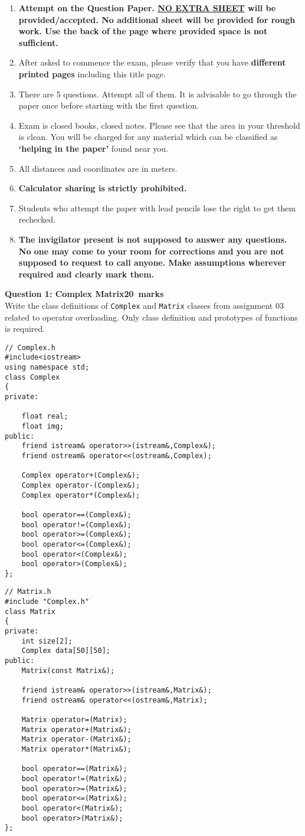 \documentclass[12pt,a4paper]{article}
\def\QOne{20}
\begin{document}
\begin{enumerate}
\item \textbf{Attempt on the Question Paper. \underline{NO EXTRA SHEET} will be provided/accepted. No
additional sheet will be provided for rough work. Use the back of the page where
provided space is not sufficient.}
\item After asked to commence the exam, please verify that you have \textbf{\pageref{LastPage} different
printed pages} including this title page.
\item There are 5 questions. Attempt all of them. It is advisable to go through the paper once
before starting with the first question.
\item Exam is closed books, closed notes. Please see that the area in your threshold is clean.
You will be charged for any material which can be classified as \textbf{`helping in the paper'}
found near you.
\item All distances and coordinates are in meters.
\item \textbf{Calculator sharing is strictly prohibited.}
\item Students who attempt the paper with lead pencils lose the right to get them rechecked.
\item \textbf{The invigilator present is not supposed to answer any questions. No one may come
to your room for corrections and you are not supposed to request to call anyone.
Make assumptions wherever required and clearly mark them.}
\end{enumerate}
\newpage
\noindent\textbf{Question 1: Complex Matrix\hfill \QOne~marks}\\
Write the class definitions of \verb|Complex| and \verb|Matrix| classes from assignment 03 related to operator overloading. Only class definition and prototypes of functions is required.
\begin{lstlisting}
// Complex.h
#include<iostream>
using namespace std;
class Complex
{
private:

	float real;
	float img;
public:
	friend istream& operator>>(istream&,Complex&);
	friend ostream& operator<<(ostream&,Complex);

	Complex operator+(Complex&);
	Complex operator-(Complex&);
	Complex operator*(Complex&);

	bool operator==(Complex&);
	bool operator!=(Complex&);
	bool operator>=(Complex&);
	bool operator<=(Complex&);
	bool operator<(Complex&);
	bool operator>(Complex&);
};
\end{lstlisting}
\begin{lstlisting}
// Matrix.h
#include "Complex.h"
class Matrix
{
private:
	int size[2];
	Complex data[50][50];
public:
	Matrix(const Matrix&);

	friend istream& operator>>(istream&,Matrix&);
	friend ostream& operator<<(ostream&,Matrix);

	Matrix operator=(Matrix);
	Matrix operator+(Matrix&);
	Matrix operator-(Matrix&);
	Matrix operator*(Matrix&);

	bool operator==(Matrix&);
	bool operator!=(Matrix&);
	bool operator>=(Matrix&);
	bool operator<=(Matrix&);
	bool operator<(Matrix&);
	bool operator>(Matrix&);
};
\end{lstlisting}
\end{document}
